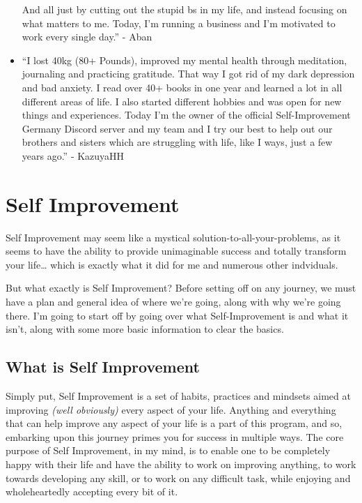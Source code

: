 \documentclass[
]{book}
\begin{document}
\begin{itemize}
  And all just by cutting out the stupid bs in my life, and instead focusing on what matters to me. Today, I'm running a business and I'm motivated to work every single day.'' - Aban
\item
  ``I lost 40kg (80+ Pounds), improved my mental health through meditation, journaling and practicing gratitude. That way I got rid of my dark depression and bad anxiety. I read over 40+ books in one year and learned a lot in all different areas of life. I also started different hobbies and was open for new things and experiences. Today I'm the owner of the official Self-Improvement Germany Discord server and my team and I try our best to help out our brothers and sisters which are struggling with life, like I ways, just a few years ago.'' - KazuyaHH
\end{itemize}

\hypertarget{self-improvement}{%
\chapter{Self Improvement}\label{self-improvement}}

Self Improvement may seem like a mystical solution-to-all-your-problems, as it seems to have the ability to provide unimaginable success and totally transform your life\ldots{} which is exactly what it did for me and numerous other indviduals.

But what exactly is Self Improvement? Before setting off on any journey, we must have a plan and general idea of where we're going, along with why we're going there. I'm going to start off by going over what Self-Improvement is and what it isn't, along with some more basic information to clear the basics.

\hypertarget{what-is-self-improvement}{%
\section{What is Self Improvement}\label{what-is-self-improvement}}

Simply put, Self Improvement is a set of habits, practices and mindsets aimed at improving \emph{(well obviously)} every aspect of your life. Anything and everything that can help improve any aspect of your life is a part of this program, and so, embarking upon this journey primes you for success in multiple ways. The core purpose of Self Improvement, in my mind, is to enable one to be completely happy with their life and have the ability to work on improving anything, to work towards developing any skill, or to work on any difficult task, while enjoying and wholeheartedly accepting every bit of it.
\end{document}
